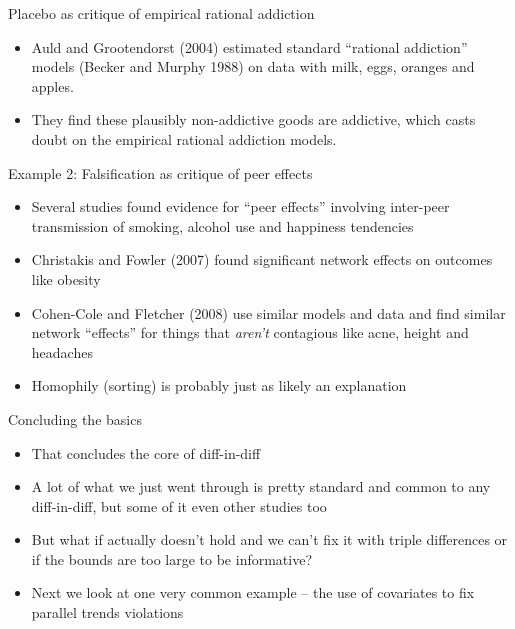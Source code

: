 \documentclass{beamer}
\begin{document}
\begin{frame}{Placebo as critique of empirical rational addiction}

\begin{itemize}
	\item Auld and Grootendorst (2004) estimated standard ``rational addiction'' models (Becker and Murphy 1988) on data with milk, eggs, oranges and apples.  
	\item They find these plausibly non-addictive goods are addictive, which casts doubt on the empirical rational addiction models.
\end{itemize}

\end{frame}

\begin{frame}{Example 2: Falsification as critique of peer effects}

\begin{itemize}
	\item Several studies found evidence for ``peer effects'' involving inter-peer transmission of smoking, alcohol use and happiness tendencies
	\item Christakis and Fowler (2007) found significant network effects on outcomes like obesity
	\item Cohen-Cole and Fletcher (2008) use similar models and data and find similar network ``effects'' for things that \emph{aren't} contagious like acne, height and headaches
	\item Homophily (sorting) is probably just as likely an explanation
\end{itemize}

\end{frame}

\begin{frame}{Concluding the basics}


\begin{itemize}

\item That concludes the core of diff-in-diff
\item A lot of what we just went through is pretty standard and common to any diff-in-diff, but some of it even other studies too
\item But what if actually doesn't hold and we can't fix it with triple differences or if the bounds are too large to be informative?  
\item Next we look at one very common example -- the use of covariates to fix parallel trends violations

\end{itemize}

\end{frame}
\end{document}
